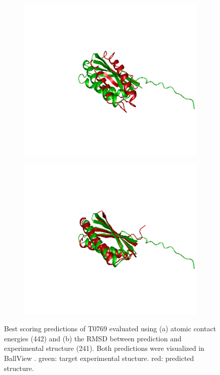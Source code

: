 \documentclass[11pt,a4paper]{article}
\renewcommand{\(}{\left (}
\renewcommand{\)}{\right )}
\begin{document}
\begin{figure}[!h]
	\begin{subfigure}{.5\textwidth}
		\includegraphics[width=\textwidth]{figures/T0769TS442}
		\subcaption{}
	\end{subfigure}
	\begin{subfigure}{.5\textwidth}
		\includegraphics[width=\textwidth]{figures/T0769TS241}
		\subcaption{}
	\end{subfigure}
	 \caption{Best scoring predictions of T0769 evaluated using (a) atomic contact energies (442) and (b) the RMSD between prediction and experimental structure (241). Both predictions were visualized in BallView \citep{ballview}. green: target experimental stucture. red: predicted structure.}
\end{figure}
\end{document}
